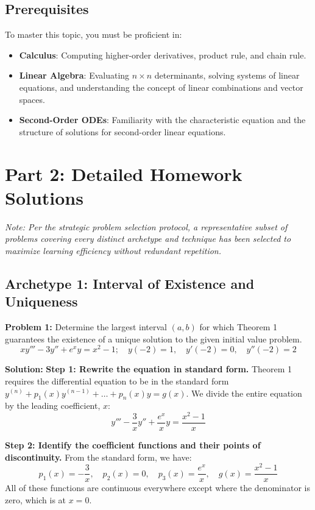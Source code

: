 \documentclass[11pt,letterpaper]{article}
\begin{document}
\subsection{Prerequisites}
To master this topic, you must be proficient in:
\begin{itemize}
    \item \textbf{Calculus}: Computing higher-order derivatives, product rule, and chain rule.
    \item \textbf{Linear Algebra}: Evaluating $n \times n$ determinants, solving systems of linear equations, and understanding the concept of linear combinations and vector spaces.
    \item \textbf{Second-Order ODEs}: Familiarity with the characteristic equation and the structure of solutions for second-order linear equations.
\end{itemize}

\newpage
\section{Part 2: Detailed Homework Solutions}
\textit{Note: Per the strategic problem selection protocol, a representative subset of problems covering every distinct archetype and technique has been selected to maximize learning efficiency without redundant repetition.}

\subsection{Archetype 1: Interval of Existence and Uniqueness}

\textbf{Problem 1:} Determine the largest interval $(a,b)$ for which Theorem 1 guarantees the existence of a unique solution to the given initial value problem.
\[ xy''' - 3y'' + e^x y = x^2 - 1; \quad y(-2) = 1, \quad y'(-2) = 0, \quad y''(-2) = 2 \]

\textbf{Solution:}
\textbf{Step 1: Rewrite the equation in standard form.}
Theorem 1 requires the differential equation to be in the standard form $y^{(n)} + p_1(x)y^{(n-1)} + \dots + p_n(x)y = g(x)$. We divide the entire equation by the leading coefficient, $x$:
\[ y''' - \frac{3}{x}y'' + \frac{e^x}{x}y = \frac{x^2 - 1}{x} \]

\textbf{Step 2: Identify the coefficient functions and their points of discontinuity.}
From the standard form, we have:
\[ p_1(x) = -\frac{3}{x}, \quad p_2(x) = 0, \quad p_3(x) = \frac{e^x}{x}, \quad g(x) = \frac{x^2 - 1}{x} \]
All of these functions are continuous everywhere except where the denominator is zero, which is at $x = 0$.
\end{document}
